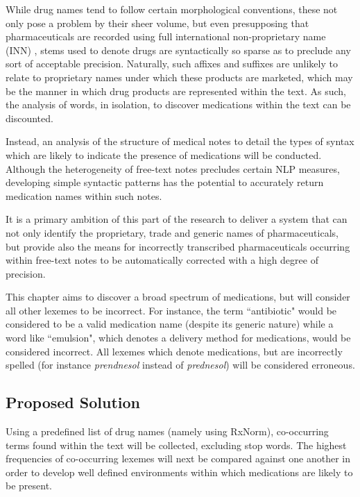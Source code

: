  While drug names tend to follow certain morphological conventions, these not only pose a problem by their sheer volume, but even presupposing that pharmaceuticals are recorded using full international non-proprietary name \\ (INN) \cite{dunne2013review}, stems used to denote drugs are syntactically so sparse as to preclude any sort of acceptable precision. Naturally, such affixes and suffixes are unlikely to relate to proprietary names under which these products are marketed, which may be the manner in which drug products are represented within the text. As such, the analysis of words, in isolation, to discover medications within the text can be discounted. 
 

Instead, an analysis of the structure of medical notes to detail the types of syntax which are likely to indicate the presence of medications will be conducted. Although the heterogeneity of free-text notes precludes certain NLP measures, developing simple syntactic patterns has the potential to accurately return medication names within such notes.

It is a primary ambition of this part of the research to deliver a system that can not only identify the proprietary, trade and generic names of pharmaceuticals, but provide also the means for incorrectly transcribed pharmaceuticals occurring within free-text notes to be automatically corrected with a high degree of precision. 


This chapter aims to discover a broad spectrum of medications, but will consider all other lexemes to be incorrect. For instance, the term ``antibiotic" would be considered to be a valid medication name (despite its generic nature) while a word like ``emulsion", which denotes a delivery method for medications, would be considered incorrect. All lexemes which denote medications, but are incorrectly spelled (for instance \textit{prendnesol} instead of \textit{prednesol}) will be considered erroneous.  

\subsection{Proposed Solution}
\label{section:prescription-solution}

Using a predefined list of drug names (namely using RxNorm), co-occurring terms found within the text will be collected, excluding stop words.  The highest frequencies of co-occurring lexemes will next be compared against one another in order to develop well defined environments within which medications are likely to be present. 

